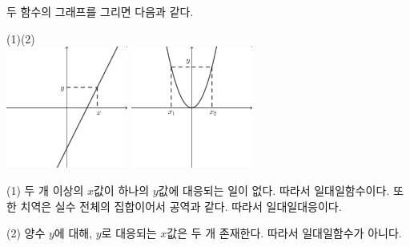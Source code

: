 \documentclass{oblivoir}
\begin{document}
\newpage
\begin{mdframed}[frametitle=방법2,nobreak=false]
두 함수의 그래프를 그리면 다음과 같다.
\begin{center}
(1)\hspace{120pt}(2)\\[10pt]
\includegraphics[width=0.3\textwidth]{various_4-2}\qquad\qquad
\includegraphics[width=0.3\textwidth]{various_4-3}
\end{center}

(1) %
두 개 이상의 \(x\)값이 하나의 \(y\)값에 대응되는 일이 없다.
따라서 일대일함수이다.
또한
치역은 실수 전체의 집합이어서 공역과 같다.
따라서 일대일대응이다.

(2)%
양수 \(y\)에 대해, \(y\)로 대응되는 \(x\)값은 두 개 존재한다.
따라서 일대일함수가 아니다.
\end{mdframed}
\end{document}
